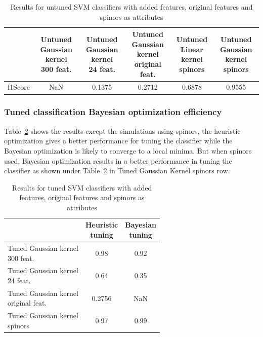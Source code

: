 \begin{table}[hbt!]
\caption{\label{tab:GaussianUntuned} Results for untuned SVM classifiers with added features, original features and spinors as attributes}
\centering
\begin{tabular}{lccccc}
\hline
& \makecell{Untuned \\ Gaussian kernel \\ 300 feat.} & \makecell{Untuned \\ Gaussian kernel \\ 24 feat.} & \makecell{Untuned \\ Gaussian kernel \\ original feat.} & \makecell{Untuned \\ Linear kernel \\ spinors}& \makecell{Untuned \\ Gaussian kernel \\ spinors }\\\hline
f1Score& NaN & 0.1375 & 0.2712 & 0.6878 & 0.9555\\
\hline
\end{tabular}
\end{table}

\subsubsection{Tuned classification Bayesian optimization efficiency}

Table~\ref{tab:GaussianTuned} shows the results except the simulations using spinors, the heuristic optimization gives a better performance for tuning the classifier while the Bayesian optimization is likely to converge to a local minima. But when spinors used, Bayesian optimization results in a better performance in tuning the classifier as shown under Table~\ref{tab:GaussianTuned} in Tuned Gaussian Kernel spinors row.  

\begin{table}[hbt!]
\caption{\label{tab:GaussianTuned} Results for tuned SVM classifiers with added features, original features and spinors as attributes}
\centering
\begin{tabular}{lcc}
\hline
& \makecell{ Heuristic\\ tuning} & \makecell{ Bayesian\\ tuning}\\\hline
 \makecell{Tuned Gaussian kernel \\ 300 feat.} & 0.98 & 0.92 \\
 \makecell{Tuned Gaussian kernel \\ 24 feat.} & 0.64 & 0.35 \\
 \makecell{Tuned Gaussian kernel \\ original feat.}  & 0.2756 & NaN\\
  \makecell{Tuned Gaussian kernel \\ spinors} & 0.97 & 0.99 \\
\hline
\end{tabular}
\end{table}

